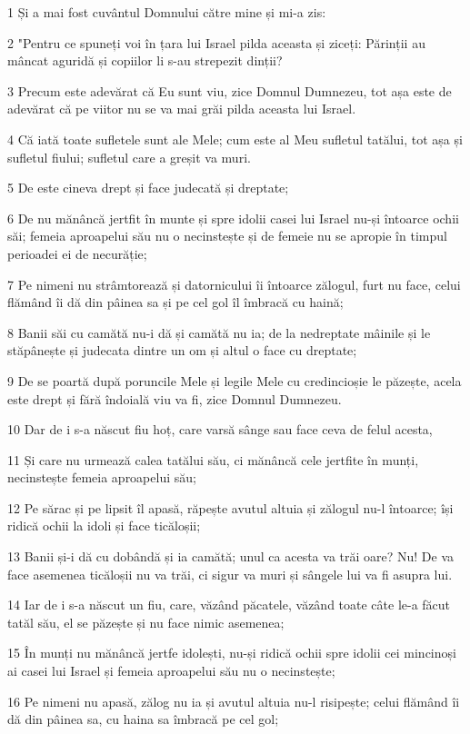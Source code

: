 \par 1 Și a mai fost cuvântul Domnului către mine și mi-a zis:
\par 2 "Pentru ce spuneți voi în țara lui Israel pilda aceasta și ziceți: Părinții au mâncat aguridă și copiilor li s-au strepezit dinții?
\par 3 Precum este adevărat că Eu sunt viu, zice Domnul Dumnezeu, tot așa este de adevărat că pe viitor nu se va mai grăi pilda aceasta lui Israel.
\par 4 Că iată toate sufletele sunt ale Mele; cum este al Meu sufletul tatălui, tot așa și sufletul fiului; sufletul care a greșit va muri.
\par 5 De este cineva drept și face judecată și dreptate;
\par 6 De nu mănâncă jertfit în munte și spre idolii casei lui Israel nu-și întoarce ochii săi; femeia aproapelui său nu o necinstește și de femeie nu se apropie în timpul perioadei ei de necurăție;
\par 7 Pe nimeni nu strâmtorează și datornicului îi întoarce zălogul, furt nu face, celui flămând îi dă din pâinea sa și pe cel gol îl îmbracă cu haină;
\par 8 Banii săi cu camătă nu-i dă și camătă nu ia; de la nedreptate mâinile și le stăpânește și judecata dintre un om și altul o face cu dreptate;
\par 9 De se poartă după poruncile Mele și legile Mele cu credincioșie le păzește, acela este drept și fără îndoială viu va fi, zice Domnul Dumnezeu.
\par 10 Dar de i s-a născut fiu hoț, care varsă sânge sau face ceva de felul acesta,
\par 11 Și care nu urmează calea tatălui său, ci mănâncă cele jertfite în munți, necinstește femeia aproapelui său;
\par 12 Pe sărac și pe lipsit îl apasă, răpește avutul altuia și zălogul nu-l întoarce; își ridică ochii la idoli și face ticăloșii;
\par 13 Banii și-i dă cu dobândă și ia camătă; unul ca acesta va trăi oare? Nu! De va face asemenea ticăloșii nu va trăi, ci sigur va muri și sângele lui va fi asupra lui.
\par 14 Iar de i s-a născut un fiu, care, văzând păcatele, văzând toate câte le-a făcut tatăl său, el se păzește și nu face nimic asemenea;
\par 15 În munți nu mănâncă jertfe idolești, nu-și ridică ochii spre idolii cei mincinoși ai casei lui Israel și femeia aproapelui său nu o necinstește;
\par 16 Pe nimeni nu apasă, zălog nu ia și avutul altuia nu-l risipește; celui flămând îi dă din pâinea sa, cu haina sa îmbracă pe cel gol;

